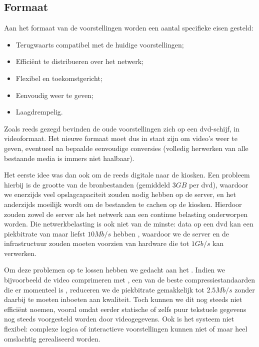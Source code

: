 \subsection{Formaat}

Aan het formaat van de voorstellingen worden een aantal specifieke eisen gesteld:
\begin{itemize}
\item Terugwaarts compatibel met de huidige voorstellingen;
\item Efficiënt te distribueren over het netwerk;
\item Flexibel en toekomstgericht;
\item Eenvoudig weer te geven;
\item Laagdrempelig.
\end{itemize}

Zoals reeds gezegd bevinden de oude voorstellingen zich op een \acs{dvd}-schijf, in videoformaat. Het nieuwe formaat moet dus in staat zijn om video's weer te geven, eventueel na bepaalde eenvoudige conversies (volledig herwerken van alle bestaande media is immers niet haalbaar).

Het eerste idee was dan ook om de reeds digitale  naar de kiosken. Een probleem hierbij is de grootte van de bronbestanden (gemiddeld $3 GB$ per \ac{dvd}), waardoor we enerzijds veel opslagcapaciteit zouden nodig hebben op de server, en het anderzijds moeilijk wordt om de bestanden te cachen op de kiosken. Hierdoor zouden zowel de server als het netwerk aan een continue belasting onderworpen worden. Die netwerkbelasting is ook niet van de minste: data op een \ac{dvd} kan een piekbitrate van maar liefst $10 Mb/s$ hebben \citep[paragraaf 3.4]{dvddemistified}, waardoor we de server en de infrastructuur zouden moeten voorzien van hardware die tot $1 Gb/s$ kan verwerken.

Om deze problemen op te lossen hebben we gedacht aan het . Indien we bijvoorbeeld de video comprimeren met , een van de beste compressiestandaarden die er momenteel is \citep{codecs}, reduceren we de piekbitrate gemakkelijk tot $2.5 Mb/s$ zonder daarbij te moeten inboeten aan kwaliteit. Toch kunnen we dit nog steeds niet efficiënt noemen, vooral omdat eerder statische of zelfs puur tekstuele gegevens nog steeds voorgesteld worden door videogegevens. Ook is het systeem niet flexibel: complexe logica of interactieve voorstellingen kunnen niet of maar heel omslachtig gerealiseerd worden.

